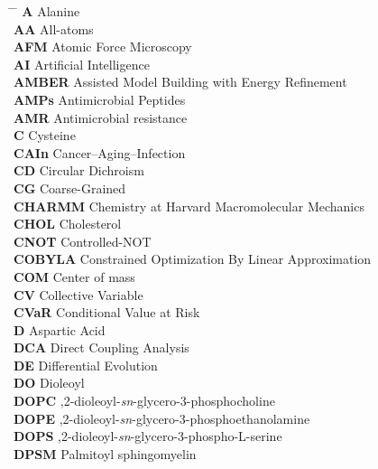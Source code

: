 \documentclass[12pt, twoside, openany]{book}
\begin{document}
\begin{flushleft} %
    \begin{tabbing}
        \hspace{3cm} \= \hspace{5cm} \= \kill
        \textbf{A} \> Alanine \\
        \textbf{AA} \> All-atoms \\
        \textbf{AFM} \> Atomic Force Microscopy \\
        \textbf{AI} \> Artificial Intelligence \\
        \textbf{AMBER} \> Assisted Model Building with Energy Refinement \\
        \textbf{AMPs} \> Antimicrobial Peptides \\
        \textbf{AMR} \> Antimicrobial resistance \\
        \textbf{C} \> Cysteine \\
        \textbf{CAIn} \> Cancer--Aging--Infection  \\
        \textbf{CD} \> Circular Dichroism \\
        \textbf{CG} \> Coarse-Grained \\
        \textbf{CHARMM} \> Chemistry at Harvard Macromolecular Mechanics \\
        \textbf{CHOL} \> Cholesterol \\
        \textbf{CNOT} \> Controlled-NOT \\
        \textbf{COBYLA} \> Constrained Optimization By Linear Approximation \\
        \textbf{COM} \> Center of mass \\
        \textbf{CV} \> Collective Variable \\
        \textbf{CVaR} \> Conditional Value at Risk \\
        \textbf{D} \> Aspartic Acid \\
        \textbf{DCA} \> Direct Coupling Analysis \\
        \textbf{DE} \> Differential Evolution \\
        \textbf{DO} \> Dioleoyl \\
        \textbf{DOPC} ,2-dioleoyl-\textit{sn}-glycero-3-phosphocholine \\
        \textbf{DOPE} ,2-dioleoyl-\textit{sn}-glycero-3-phosphoethanolamine \\
        \textbf{DOPS} ,2-dioleoyl-\textit{sn}-glycero-3-phospho-L-serine \\
        \textbf{DPSM} \> Palmitoyl sphingomyelin \\

\end{tabbing}
\end{flushleft}
\end{document}
